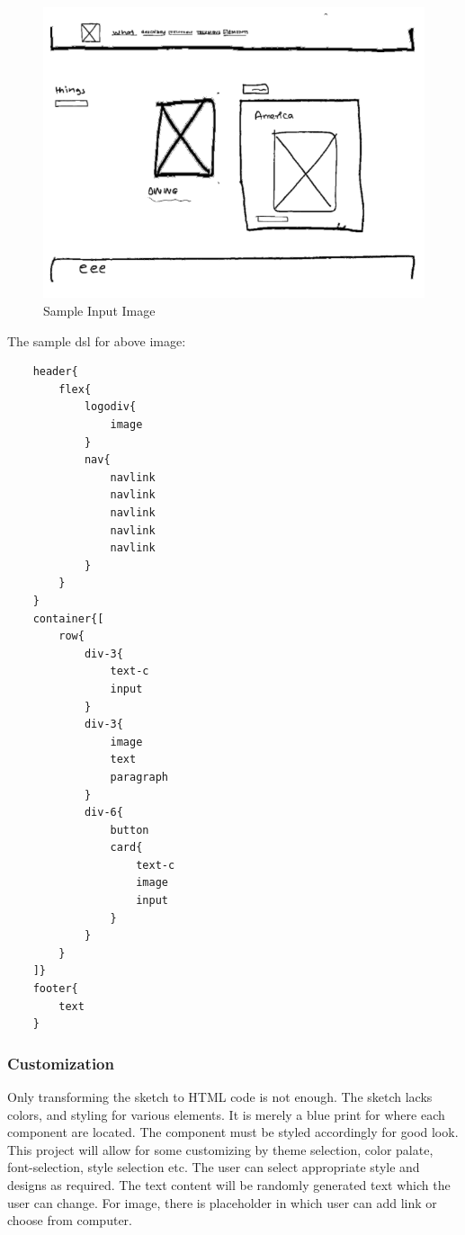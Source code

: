 \documentclass{ioereport}
\begin{document}
    \begin{figure}[H]
        \includegraphics[scale=.6]{images/sample image.png}
        \caption{Sample Input Image}
        \label{fig:lsamp}
    \end{figure}




The sample \gls{dsl} for above image:




\begin{verbatim}
    header{
        flex{
            logodiv{
                image
            }
            nav{
                navlink
                navlink
                navlink
                navlink
                navlink
            }
        }
    }
    container{[
        row{
            div-3{
                text-c
                input
            }
            div-3{
                image
                text
                paragraph
            }
            div-6{
                button
                card{
                    text-c
                    image
                    input
                }
            }
        }
    ]}
    footer{
        text
    }
    \end{verbatim}


\subsubsection{Customization}
Only transforming the sketch to HTML code is not enough. The sketch lacks colors,
and styling for various elements. It is merely a blue print for where each component are
located. The component must be styled accordingly for good look. This project will allow for some customizing by theme selection, color palate, font-selection, style
selection etc. The user can select appropriate style and designs as required.
The text content will be randomly generated text which the user can change. For image,
there is placeholder in which user can add link or choose from computer.
\end{document}
